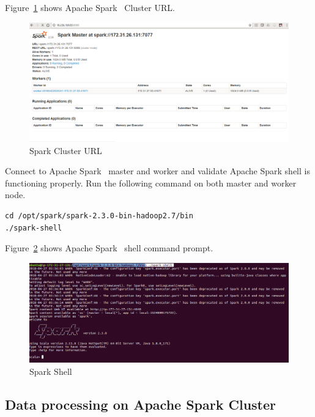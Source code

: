 Figure~\ref{f:spark-cluster-url} shows Apache
Spark~\cite{hid-sp18-511-www-spark} Cluster URL\@.

\begin{figure}[!ht]
\centering\includegraphics[width=\columnwidth]{images/sparkclusterurl.png}
\caption{Spark Cluster URL}\label{f:spark-cluster-url}
\end{figure}

Connect to Apache Spark~\cite{hid-sp18-511-www-spark} master and
worker and validate Apache Spark shell is functioning properly.  Run
the following command on both master and worker node.

\begin{verbatim}
cd /opt/spark/spark-2.3.0-bin-hadoop2.7/bin
./spark-shell 
\end{verbatim}
 
Figure~\ref{f:spark-shell} shows Apache
Spark~\cite{hid-sp18-511-www-spark} shell command prompt.

\begin{figure}[!ht]
	\centering\includegraphics[width=\columnwidth]{images/sparkshell.png}
	\caption{Spark Shell}\label{f:spark-shell}
\end{figure}

\subsection{Data processing on Apache Spark Cluster}

